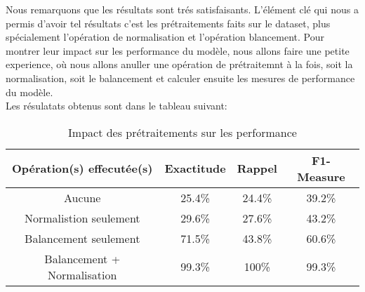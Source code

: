 Nous remarquons que les résultats sont trés satisfaisants. L'élément clé qui nous a permis d'avoir tel résultats c'est les prétraitements faits sur le dataset, plus spécialement l'opération de normalisation et l'opération blancement. Pour montrer leur impact  sur les performance du modèle, nous allons faire une petite experience, où nous allons anuller une opération de prétraitemnt à la fois, soit la normalisation, soit le balancement et calculer ensuite les mesures de performance du modèle.\\

Les résulatats obtenus sont dans le tableau suivant:
\begin{table}[h]
	\begin{center}
		\begin{tabular}{  | c | c | c | c | }
			\hline
			 Opération(s) effecutée(s) & Exactitude & Rappel & F1-Measure \\
			\hline
			\hline
			Aucune & 25.4\% & 24.4\% & 39.2\% \\
			\hline
			Normalistion seulement & 29.6\% & 27.6\% & 43.2\% \\
			\hline
			Balancement seulement & 71.5\% & 43.8\% & 60.6\% \\
			\hline
			\rowcolor[rgb]{0.75,0.75,0.75}
			Balancement + Normalisation & 99.3\% & 100\% & 99.3\% \\
			\hline
		\end{tabular}
		\caption{Impact des prétraitements sur les performance}
	\end{center}
	\label{table:compare}
\end{table}

